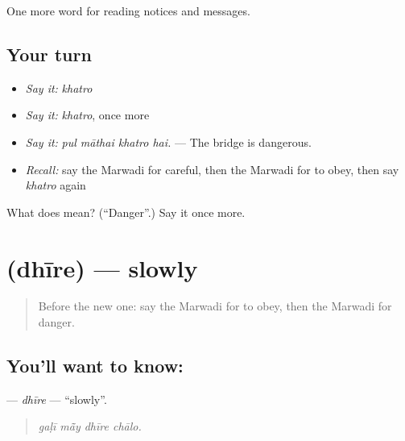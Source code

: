 \begin{grammarlens}[title={What you've built}]
One more word for reading notices and messages.
\end{grammarlens}

\subsection*{Your turn}
\begin{itemize}
\raggedright
  \item \emph{Say it:} \emph{khatro}
  \item \emph{Say it:} \emph{khatro}, once more
  \item \emph{Say it:} \emph{pul māthai khatro hai.} — The bridge is dangerous.
  \item \emph{Recall:} say the Marwadi for careful, then the Marwadi for to obey, then say \emph{khatro} again
\end{itemize}

\begin{tcolorbox}[breakable,colback=teal!4,colframe=teal!35!black,title={Before you move on}]
What does  mean? (\textquotedblleft{}Danger\textquotedblright{}.) Say it once more.
\end{tcolorbox}
\section[\texorpdfstring{\mw{धीरे} (dhīre)}{धीरे (dhīre)}]{ (dhīre) — slowly}

\label{lesson:MW-C192-dhire}



\begin{quote}
Before the new one: say the Marwadi for to obey, then the Marwadi for danger.
\end{quote}

\subsection*{You'll want to know: }
\textbf{} — \emph{dhīre} — \textquotedblleft{}slowly\textquotedblright{}.

\begin{quote}
   
\end{quote}

\begin{quote}
\emph{gaḷī mā̃y dhīre chālo.}
\end{quote}

